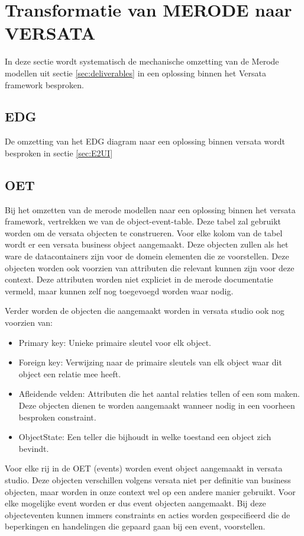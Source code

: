 \section{Transformatie van MERODE naar VERSATA}
\label{sec:mech_transform}
In deze sectie wordt systematisch de mechanische omzetting van de Merode modellen uit sectie \ref{sec:deliverables} in een oplossing binnen het Versata framework besproken.
\subsection{EDG}
De omzetting van het EDG diagram naar een oplossing binnen versata wordt besproken in sectie \ref{sec:E2UI}

\subsection{OET}
\label{sec:OET}
Bij het omzetten van de merode modellen naar een oplossing binnen het versata framework, vertrekken we van de object-event-table. Deze tabel zal gebruikt worden om de versata objecten te construeren.
Voor elke kolom van de tabel wordt er een versata business object aangemaakt. 
Deze objecten zullen als het ware de datacontainers zijn voor de domein elementen die ze voorstellen. Deze objecten worden ook voorzien van attributen die relevant kunnen zijn voor deze context. Deze attributen worden niet expliciet in de merode documentatie vermeld, maar kunnen zelf nog toegevoegd worden waar nodig.

Verder worden de objecten die aangemaakt worden in versata studio ook nog voorzien van: 
\begin{itemize}
	\item Primary key: Unieke primaire sleutel voor elk object.
	\item Foreign key: Verwijzing naar de primaire sleutels van elk object waar dit object een relatie mee heeft.
	\item Afleidende velden: Attributen die het aantal relaties tellen of een som maken. Deze objecten dienen te worden aangemaakt wanneer nodig in een voorheen besproken constraint.
	\item ObjectState: Een teller die bijhoudt in welke toestand een object zich bevindt.
\end{itemize}

Voor elke rij in de OET (events) worden event object aangemaakt in versata studio. Deze objecten verschillen volgens versata niet per definitie van business objecten, maar worden in onze context wel op een andere manier gebruikt. Voor elke mogelijke event worden er dus event objecten aangemaakt. 
Bij deze objecteventen kunnen immers constraints en acties worden gespecifieerd die de beperkingen en handelingen die gepaard gaan bij een event, voorstellen.

